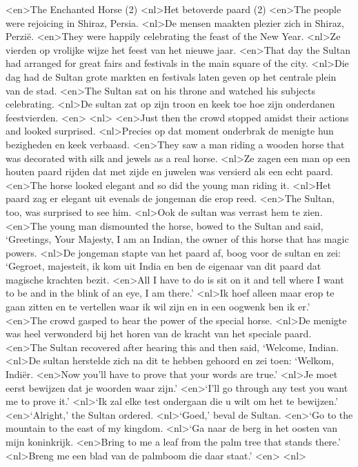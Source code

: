 <en>The Enchanted Horse (2)
<nl>Het betoverde paard (2)
<en>The people were rejoicing in Shiraz, Persia.
<nl>De mensen maakten plezier zich in Shiraz, Perzië.
<en>They were happily celebrating the feast of the New Year.
<nl>Ze vierden op vrolijke wijze  het feest van het nieuwe jaar.
<en>That day the Sultan had arranged for great fairs and festivals in the main square of the city.
<nl>Die dag had de Sultan grote markten en festivals laten geven op het centrale plein van de stad.
<en>The Sultan sat on his throne and watched his subjects celebrating.
<nl>De sultan zat op zijn troon en keek toe hoe zijn onderdanen feestvierden.
<en>
<nl>
<en>Just then the crowd stopped amidst their actions and looked surprised.
<nl>Precies op dat moment onderbrak de menigte hun bezigheden en keek verbaasd.
<en>They saw a man riding a wooden horse that was decorated with silk and jewels as a real horse.
<nl>Ze zagen een man op een houten paard rijden dat  met zijde en juwelen was versierd als een echt paard.
<en>The horse looked elegant and so did the young man riding it.
<nl>Het paard zag er elegant uit evenals  de jongeman die erop reed.
<en>The Sultan, too, was surprised to see him.
<nl>Ook de sultan was verrast hem te zien.
<en>The young man dismounted the horse, bowed to the Sultan and said, `Greetings, Your Majesty, I am an Indian, the owner of this horse that has magic powers.
<nl>De jongeman stapte van het paard af, boog voor de sultan en zei: `Gegroet, majesteit, ik kom uit India en ben de eigenaar van dit paard dat magische krachten bezit.
<en>All I have to do is sit on it and tell where I want to be and in the blink of an eye, I am there.'
<nl>Ik hoef alleen maar erop te gaan zitten en te vertellen waar ik wil zijn en in een oogwenk ben ik er.'
<en>The crowd gasped to hear the power of the special horse.
<nl>De menigte was heel verwonderd bij het horen van de kracht van het speciale paard.
<en>The Sultan recovered after hearing this and then said, `Welcome, Indian.
<nl>De sultan herstelde zich na dit te hebben gehoord en zei toen: `Welkom, Indi\"er.
<en>Now you'll have to prove that your words are true.'
<nl>Je moet eerst bewijzen dat je woorden waar zijn.'
<en>`I'll go through any test you want me to prove it.'
<nl>`Ik zal elke test ondergaan die u wilt om het te bewijzen.'
<en>`Alright,' the Sultan ordered.
<nl>`Goed,' beval de Sultan.
<en>`Go to the mountain to the east of my kingdom.
<nl>`Ga naar de berg in het oosten van mijn koninkrijk.
<en>Bring to me a leaf from the palm tree that stands there.'
<nl>Breng me een blad van de palmboom die daar staat.'
<en>
<nl>
